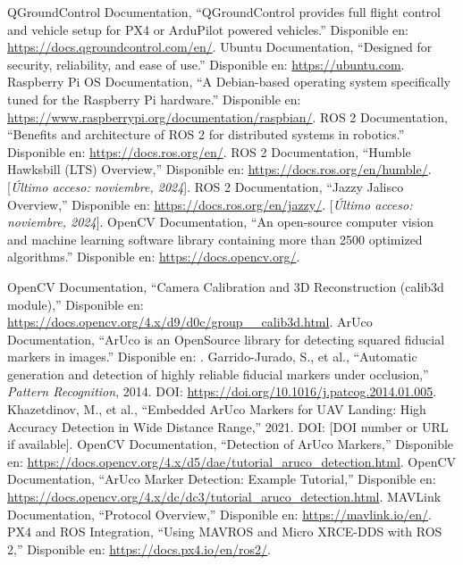 \begin{thebibliography}{30}
     QGroundControl Documentation, ``QGroundControl provides full flight control and vehicle setup for PX4 or ArduPilot powered vehicles.'' Disponible en: \url{https://docs.qgroundcontrol.com/en/}. 
     Ubuntu Documentation, ``Designed for security, reliability, and ease of use.'' Disponible en: \url{https://ubuntu.com}. 
     Raspberry Pi OS Documentation, ``A Debian-based operating system specifically tuned for the Raspberry Pi hardware.'' Disponible en: \url{https://www.raspberrypi.org/documentation/raspbian/}.
     ROS 2 Documentation, ``Benefits and architecture of ROS 2 for distributed systems in robotics.'' Disponible en: \url{https://docs.ros.org/en/}. 
    ROS 2 Documentation, ``Humble Hawksbill (LTS) Overview,'' Disponible en: \url{https://docs.ros.org/en/humble/}. [\textit{Último acceso: noviembre, 2024}].
    ROS 2 Documentation, ``Jazzy Jalisco Overview,'' Disponible en: \url{https://docs.ros.org/en/jazzy/}. [\textit{Último acceso: noviembre, 2024}].
   OpenCV Documentation, ``An open-source computer vision and machine learning software library containing more than 2500 optimized algorithms.'' Disponible en: \url{https://docs.opencv.org/}. 

   
   
    OpenCV Documentation, ``Camera Calibration and 3D Reconstruction (calib3d module),'' Disponible en: \url{https://docs.opencv.org/4.x/d9/d0c/group__calib3d.html}.
     ArUco Documentation, ``ArUco is an OpenSource library for detecting squared fiducial markers in images.'' Disponible en: \url{}. 
    Garrido-Jurado, S., et al., ``Automatic generation and detection of highly reliable fiducial markers under occlusion,'' \textit{Pattern Recognition}, 2014. DOI: \url{https://doi.org/10.1016/j.patcog.2014.01.005}.
     Khazetdinov, M., et al., ``Embedded ArUco Markers for UAV Landing: High Accuracy Detection in Wide Distance Range,'' 2021. DOI: [DOI number or URL if available].
    OpenCV Documentation, ``Detection of ArUco Markers,'' Disponible en: \url{https://docs.opencv.org/4.x/d5/dae/tutorial_aruco_detection.html}. 
    OpenCV Documentation, ``ArUco Marker Detection: Example Tutorial,'' Disponible en: \url{https://docs.opencv.org/4.x/dc/dc3/tutorial_aruco_detection.html}. 
    MAVLink Documentation, ``Protocol Overview,'' Disponible en: \url{https://mavlink.io/en/}. 
    PX4 and ROS Integration, ``Using MAVROS and Micro XRCE-DDS with ROS 2,'' Disponible en: \url{https://docs.px4.io/en/ros2/}. 


\end{thebibliography}
